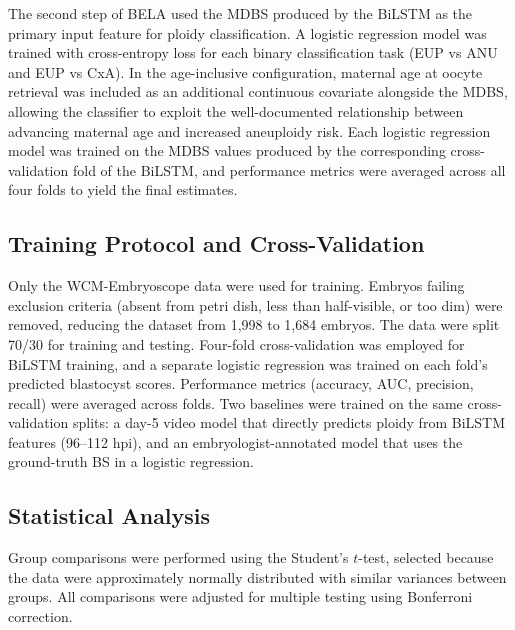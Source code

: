 \documentclass[11pt]{article}
\begin{document}
The second step of BELA used the MDBS produced by the BiLSTM as the primary input feature for ploidy classification. A logistic regression model was trained with cross-entropy loss for each binary classification task (EUP vs ANU and EUP vs CxA). In the age-inclusive configuration, maternal age at oocyte retrieval was included as an additional continuous covariate alongside the MDBS, allowing the classifier to exploit the well-documented relationship between advancing maternal age and increased aneuploidy risk. Each logistic regression model was trained on the MDBS values produced by the corresponding cross-validation fold of the BiLSTM, and performance metrics were averaged across all four folds to yield the final estimates.

\subsection{Training Protocol and Cross-Validation}

Only the WCM-Embryoscope data were used for training. Embryos failing exclusion criteria (absent from petri dish, less than half-visible, or too dim) were removed, reducing the dataset from 1{,}998 to 1{,}684 embryos. The data were split 70/30 for training and testing. Four-fold cross-validation was employed for BiLSTM training, and a separate logistic regression was trained on each fold's predicted blastocyst scores. Performance metrics (accuracy, AUC, precision, recall) were averaged across folds. Two baselines were trained on the same cross-validation splits: a day-5 video model that directly predicts ploidy from BiLSTM features (96--112 hpi), and an embryologist-annotated model that uses the ground-truth BS in a logistic regression.

\subsection{Statistical Analysis}

Group comparisons were performed using the Student's $t$-test, selected because the data were approximately normally distributed with similar variances between groups. All comparisons were adjusted for multiple testing using Bonferroni correction.




\end{document}
